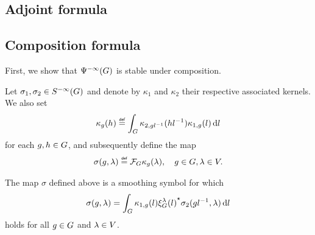 \subsection{Adjoint formula}

\subsection{Composition formula}

First, we show that ${\Psi^{-\infty} (G)}$ is stable under composition.

\begin{lemma}
    Let $\sigma_1, \sigma_2 \in {S^{-\infty} (G)}$
    and denote by $\kappa_1$ and $\kappa_2$ their respective associated kernels.
    We also set
    \begin{align*}
        \kappa_g(h) \defeq \int_\Group \kappa_{2, g l^{-1}}(h l^{-1}) \kappa_{1, g}(l) \dd l
    \end{align*}
    for each $g, h \in G$,
    and subsequently define the map
    \begin{align*}
        \sigma(g, \lambda) \defeq \Fourier \kappa_g(\lambda),
        \quad g \in \Group, \lambda \in \VectorSpace.
    \end{align*}

    The map $\sigma$ defined above is a smoothing symbol for which
    \begin{align}
        \sigma(g, \lambda) = \int_G \kappa_{1, g}(l) {\xi^{\lambda}_{G}(l)}^\star \sigma_2(g l^{-1}, \lambda) \,\mathrm{d} l
        \label{eq:formal_expression_for_the_symbol_obtained_by_composition}
    \end{align}
    holds for all $g \in G$ and $\lambda \in V$.
\end{lemma}
